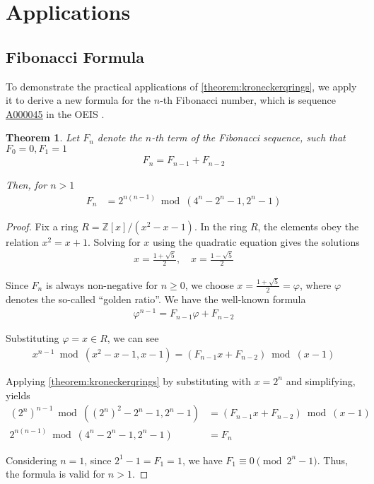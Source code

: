 \documentclass[12pt,reqno]{article}
\theoremstyle{plain}
\newtheorem{theorem}{Theorem}
\theoremstyle{definition}
\newcommand{\seqnum}[1]{\href{https://oeis.org/#1}{\rm \underline{#1}}}
\begin{document}
\section{Applications} \label{section:applications}

\subsection{Fibonacci Formula}
To demonstrate the practical applications of \cref{theorem:kroneckerqrings}, we apply it to derive a new formula for the $n$-th Fibonacci number, which is sequence \seqnum{A000045} in the OEIS \cite{A000045}.

\begin{theorem}
Let $F_n$ denote the $n$-th term of the Fibonacci sequence, such that $F_0 = 0, F_1 = 1$
\begin{align*}
    F_n = F_{n-1} + F_{n-2}
\end{align*}

Then, for $n > 1$
\begin{align*}
F_n &= 2^{n (n - 1)} \bmod{(4^n-2^n-1, 2^n-1)}
\end{align*}
\end{theorem}
\begin{proof}
Fix a ring $R = \mathbb{Z}[x]/(x^2 - x - 1)$. In the ring $R$, the elements obey the relation $x^2 = x + 1$. Solving for $x$ using the quadratic equation gives the solutions
\begin{align*}
    x = \frac{1 + \sqrt{5}}{2}, \quad x = \frac{1 - \sqrt{5}}{2}
\end{align*}

Since $F_n$ is always non-negative for $n \geq 0$, we choose $x = \frac{1 + \sqrt{5}}{2} = \varphi$, where $\varphi$ denotes the so-called ``golden ratio''. We have the well-known formula \cite{A000045}
\begin{align*}
    \varphi^{n-1} = F_{n-1} \varphi + F_{n-2}
\end{align*}

Substituting $\varphi = x \in R$, we can see
\begin{align*}
    x^{n-1} \bmod{(x^2 - x - 1, x-1)} = (F_{n-1} x + F_{n-2}) \bmod{(x-1)}
\end{align*}

Applying \cref{theorem:kroneckerqrings} by substituting with $x = 2^n$ and simplifying, yields
\begin{align*}
    (2^n)^{n-1} \bmod{((2^n)^2 - 2^n - 1, 2^n-1)} &= (F_{n-1} x + F_{n-2}) \bmod{(x-1)} \\
    2^{n (n - 1)} \bmod{(4^n - 2^n - 1, 2^n-1)} &= F_n
\end{align*}

Considering $n = 1$, since $2^1-1 = F_1 = 1$, we have $F_1 \equiv 0 \pmod{2^n - 1}$. Thus, the formula is valid for $n > 1$.
\end{proof}
\end{document}
